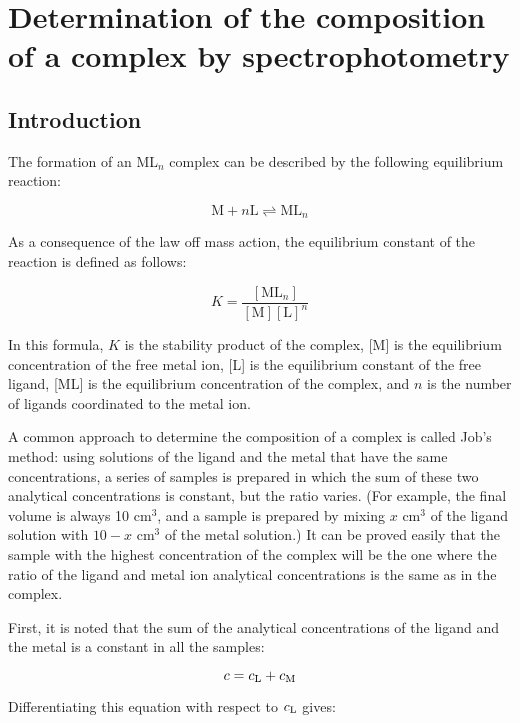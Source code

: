 \section{Determination of the composition of a complex by spectrophotometry}
\subsection{Introduction}

The formation of an ML$_n$ complex can be described by the following equilibrium reaction:

\begin{equation}
\text{M} + n\text{L} \rightleftharpoons \text{ML}_n
\end{equation}

As a consequence of the law off mass action, the equilibrium constant of the reaction is defined as follows:

\begin{equation}
K = \frac{[ \text{ML}_n ]}{[ \text{M} ][ \text{L}]^n }
\end{equation}

In this formula, $K$ is the stability product of the complex, [M] is the equilibrium concentration of the free metal ion, [L] is the equilibrium constant of the free ligand, [ML] is the equilibrium concentration of the complex, and $n$ is the number of ligands coordinated to the metal ion.

A common approach to determine the composition of a complex is called Job's method: using solutions of the ligand and the metal that have the same concentrations, a series of samples is prepared in which the sum of these two analytical concentrations is constant, but the ratio varies. (For example, the final volume is always 10 cm$^3$, and a sample is prepared by mixing $x$ cm$^3$ of the ligand solution with $10-x$ cm$^3$ of the metal solution.) It can be proved easily that the sample with the highest concentration of the complex will be the one where the ratio of the ligand and metal ion analytical concentrations is the same as in the complex. 

First, it is noted that the sum of the analytical concentrations of the ligand and the metal is a constant in all the samples:

\begin{equation}
c = c_{\text L} + c_{\text M}
\end{equation}

Differentiating this equation with respect to $c_{\text L}$ gives:

